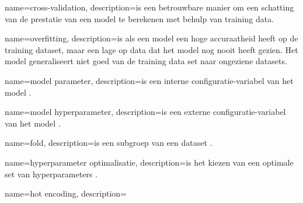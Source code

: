 {
    name=cross-validation,
    description={is een betrouwbare manier om een schatting van de prestatie van een model te berekenen met behulp van training data.}
}

{
    name=overfitting,
    description={is als een model een hoge accuraatheid heeft op de training dataset, maar een lage op data dat het model nog nooit heeft gezien. Het model generaliseert niet goed van de training data set naar ongeziene datasets.}
}

{
    name=model parameter,
    description={is een interne configuratie-variabel van het model \cite{ml-model-hyper-parameter-brownlee}.}
}

{
    name=model hyperparameter,
    description={is een externe configuratie-variabel van het model \cite{ml-model-hyper-parameter-brownlee}.}
}

{
    name=fold,
    description={is een subgroep van een dataset \cite{data-science-primer}.}
}

{
    name=hyperparameter optimalisatie,
    description={is het kiezen van een optimale set van hyperparameters \cite{hyperparameter-optimization-wikipedia}.}
}

{
    name=hot encoding,
    description={}
}

